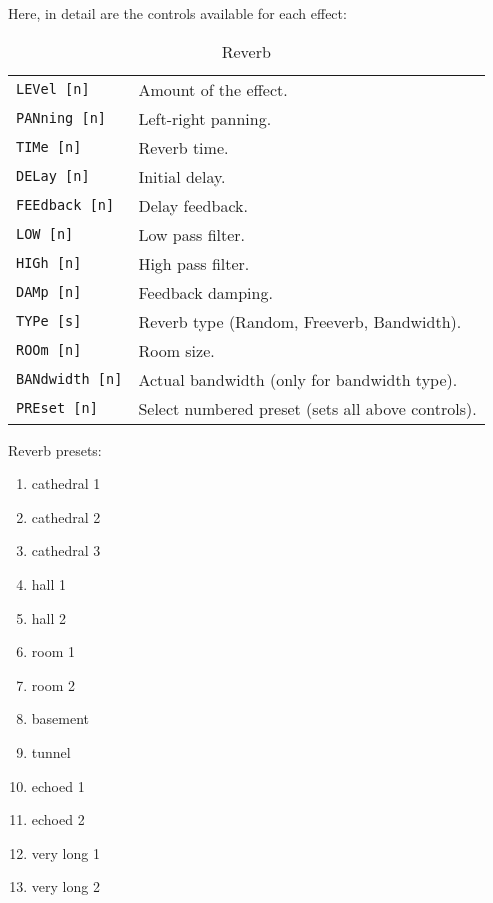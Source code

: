    Here, in detail are the controls available for each effect:
   \begin{table}[H]
      \centering
      \caption{Reverb}
      \begin{tabular}{l l}
\texttt{LEVel [n]} &
   Amount of the effect. \\
\texttt{PANning [n]} &
   Left-right panning. \\
\texttt{TIMe [n]} &
   Reverb time. \\
\texttt{DELay [n]} &
   Initial delay. \\
\texttt{FEEdback [n]} &
   Delay feedback. \\
\texttt{LOW [n]} &
   Low pass filter. \\
\texttt{HIGh [n]} &
   High pass filter. \\
\texttt{DAMp [n]} &
   Feedback damping. \\
\texttt{TYPe [s]} &
   Reverb type (Random, Freeverb, Bandwidth). \\
\texttt{ROOm [n]} &
   Room size. \\
\texttt{BANdwidth [n]} &
   Actual bandwidth (only for bandwidth type). \\
\texttt{PREset [n]} &
   Select numbered preset (sets all above controls). \\
      \end{tabular}
   \end{table}
   Reverb presets:
   \begin{enumerate}
      \item cathedral 1
      \item cathedral 2
      \item cathedral 3
      \item hall 1
      \item hall 2
      \item room 1
      \item room 2
      \item basement
      \item tunnel
      \item echoed 1
      \item echoed 2
      \item very long 1
      \item very long 2
    \end{enumerate}

